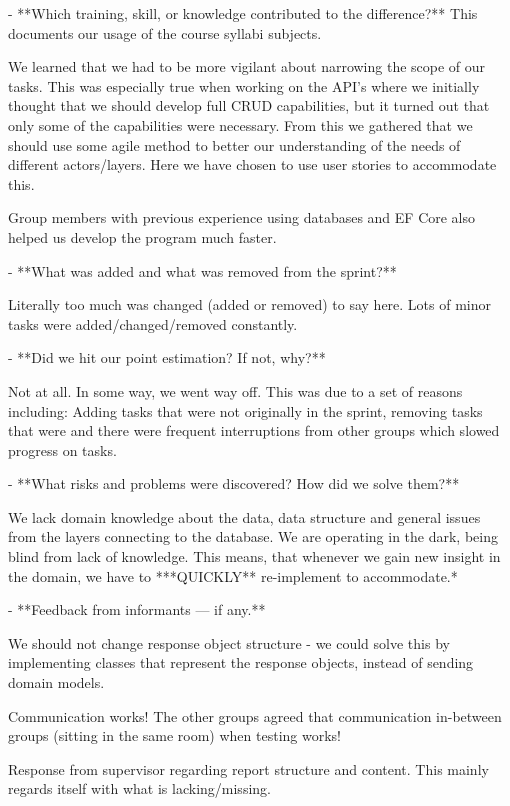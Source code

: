 - **Which training, skill, or knowledge contributed to the difference?** This documents our usage of the course syllabi subjects.
    
    We learned that we had to be more vigilant about narrowing the scope of our tasks. This was especially true when working on the API's where we initially thought that we should develop full CRUD capabilities, but it turned out that only some of the capabilities were necessary. From this we gathered that we should use some agile method to better our understanding of the needs of different actors/layers. Here we have chosen to use user stories to accommodate this. 
    
    Group members with previous experience using databases and EF Core also helped us develop the program much faster. 
    
- **What was added and what was removed from the sprint?**
    
    Literally too much was changed (added or removed) to say here. Lots of minor tasks were added/changed/removed constantly.
    
- **Did we hit our point estimation? If not, why?**
    
    Not at all. In some way, we went way off. This was due to a set of reasons including: Adding tasks that were not originally in the sprint, removing tasks that were and there were frequent interruptions from other groups which slowed progress on tasks.
    
- **What risks and problems were discovered? How did we solve them?**
    
    We lack domain knowledge about the data, data structure and general issues from the layers connecting to the database. We are operating in the dark, being blind from lack of knowledge. This means, that whenever we gain new insight in the domain, we have to ***QUICKLY** re-implement to accommodate.* 
    
- **Feedback from informants — if any.**
    
    We should not change response object structure - we could solve this by implementing classes that represent the response objects, instead of sending domain models. 
    
    Communication works! The other groups agreed that communication in-between groups (sitting in the same room) when testing works!
    
    Response from supervisor regarding report structure and content. This mainly regards itself with what is lacking/missing.
    
